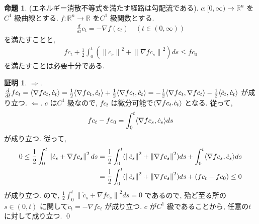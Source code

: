 \documentclass[10pt, fleqn, label-section=none]{bxjsarticle}
\theoremstyle{definition}
\newtheorem{prop}[dfn]{命題}
\newtheorem*{pf*}{証明}
\newcommand{\tbra}[1]{\mleft\langle#1\mright\rangle}
\newcommand{\norm}[1]{\left\|#1\right\|}
\newcommand{\naraba}{\Rightarrow}
\newcommand{\gyaku}{\Leftarrow}
\renewcommand{\;}{\, ; \,}
\begin{document}
\begin{prop}(エネルギー消散不等式を満たす経路は勾配流である). 
$c: [0, \infty) \rightarrow \mathbb R^n$ を$C^1$ 級曲線とする. $f: \mathbb R^n \rightarrow \mathbb R$ を$C^1$ 級関数とする. 
\begin{align*} \frac{d}{dt} c_t = - \nabla f (c_t) \quad (t \in (0,\infty)) \end{align*}
を満たすことと, 
\begin{align*} f c_t + \frac{1}{2} \int_0^t ( \norm{\dot c_s} ^2 + \norm{\nabla f c_s} ^2 ) ds \leq f c_0 \end{align*}
を満たすことは必要十分である. 
\end{prop}
\begin{pf*}$\naraba$. $\frac{d}{dt} fc_t = \tbra{\nabla f c_t, \dot c_t} = \frac{1}{2}  \tbra{\nabla f c_t, \dot c_t}  + \frac{1}{2}  \tbra{\nabla f c_t, \dot c_t}  = - \frac{1}{2} \tbra{\nabla f c_t, \nabla f c_t} - \frac{1}{2} \tbra{\dot c_t, \dot c_t}$ が成り立つ.  $\gyaku$. $c$ は$C^1$ 級なので, $fc_t$ は微分可能で$\tbra{\nabla f c_t. \dot c_t}$ となる. 従って, 
\begin{align*} f c_t - f c_0 = \int_0^t \tbra{\nabla f c_s, \dot c_s} ds \end{align*}
が成り立つ. 従って, 
\begin{align*} 0 \leq \frac{1}{2} \int_0^t \norm{\dot c_s + \nabla f c_s}^2 ds &= \frac{1}{2} \int_0^t ( \norm{\dot c_s} ^2 + \norm{\nabla f c_s} ^2 ) ds + \int_0^t \tbra{\nabla f c_s, \dot c_s} ds \\&=\frac{1}{2} \int_0^t ( \norm{\dot c_s} ^2 + \norm{\nabla f c_s} ^2 ) ds  + ( f c_t - f c_0 ) \leq 0   \end{align*}
が成り立つ. ので, $\frac{1}{2} \int_0^t \norm{\dot c_s + \nabla f c_s}^2 ds = 0$ であるので, 殆ど至る所の$s \in (0, t)$ に関して$\dot c_t = - \nabla f c_t $ が成り立つ. $c$ が$C^1$ 級であることから, 任意の$t$ に対して成り立つ. 
\qed
\end{pf*}
\end{document}
